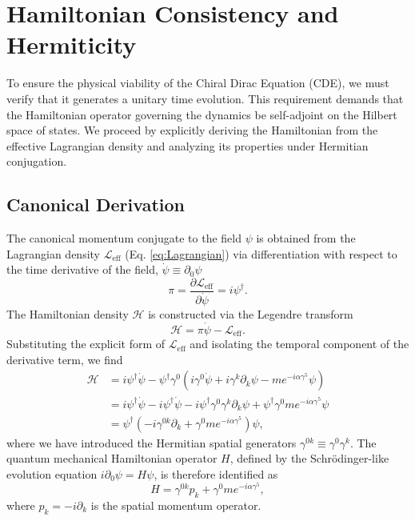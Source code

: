 \section{Hamiltonian Consistency and Hermiticity}
\label{sec:Hermiticity}

To ensure the physical viability of the Chiral Dirac Equation (CDE), we must verify
that it generates a unitary time evolution. This requirement demands that the
Hamiltonian operator governing the dynamics be self-adjoint on the Hilbert space
of states. We proceed by explicitly deriving the Hamiltonian from the effective
Lagrangian density and analyzing its properties under Hermitian conjugation.

\subsection{Canonical Derivation}

The canonical momentum conjugate to the field $\psi$ is obtained from the
Lagrangian density $\mathcal{L}_{\text{eff}}$ (Eq. \ref{eq:Lagrangian}) via
differentiation with respect to the time derivative of the field, $\dot{\psi}
\equiv \partial_0 \psi$
\begin{equation}
	\pi = \frac{\partial \mathcal{L}_{\text{eff}}}{\partial \dot{\psi}} =
	i \psi^\dagger.
\end{equation}
The Hamiltonian density $\mathcal{H}$ is constructed via the Legendre transform
\begin{equation}
	\mathcal{H} = \pi \dot{\psi} - \mathcal{L}_{\text{eff}}.
\end{equation}
Substituting the explicit form of $\mathcal{L}_{\text{eff}}$ and isolating the
temporal component of the derivative term, we find
\begin{align}
	\mathcal{H} &= i \psi^\dagger \dot{\psi} - \psi^\dagger \gamma^0
	(i \gamma^0 \dot{\psi} + i \gamma^k \partial_k \psi - m e^{-i \alpha \gamma^5} \psi)
	\nonumber \\
							&= i \psi^\dagger \dot{\psi} - i \psi^\dagger \dot{\psi} - i \psi^\dagger \gamma^0
							\gamma^k \partial_k \psi + \psi^\dagger \gamma^0 m e^{-i \alpha \gamma^5} \psi
							\nonumber \\
							&= \psi^\dagger \left( -i \gamma^{0k} \partial_k + \gamma^0 m e^{-i \alpha \gamma^5}
							\right) \psi,
\end{align}
where we have introduced the Hermitian spatial generators $\gamma^{0k} \equiv
\gamma^0 \gamma^k$. The quantum mechanical Hamiltonian operator $H$, defined by
the Schrödinger-like evolution equation $i \partial_0 \psi = H \psi$, is
therefore identified as
\begin{equation}
	H = \gamma^{0k} p_k + \gamma^0 m e^{-i \alpha \gamma^5},
	\label{eq:HamiltonianOperator}
\end{equation}
where $p_k = -i \partial_k$ is the spatial momentum operator.

